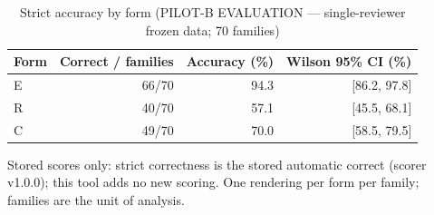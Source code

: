 \begin{table}[t]
\centering
\small
\caption{Strict accuracy by form (PILOT-B EVALUATION --- single-reviewer frozen data; 70 families)}
\label{tab:pilotb-Llama-3.2-3B-Instruct-accuracy}
\begin{tabular}{lrrr}
\toprule
Form & Correct / families & Accuracy (\%) & Wilson 95\% CI (\%) \\
\midrule
E & 66/70 & 94.3 & [86.2, 97.8] \\
R & 40/70 & 57.1 & [45.5, 68.1] \\
C & 49/70 & 70.0 & [58.5, 79.5] \\
\bottomrule
\end{tabular}
\par\smallskip
\parbox{\linewidth}{\footnotesize Stored scores only: strict correctness is the stored automatic correct (scorer v1.0.0); this tool adds no new scoring. One rendering per form per family; families are the unit of analysis.}
\end{table}
